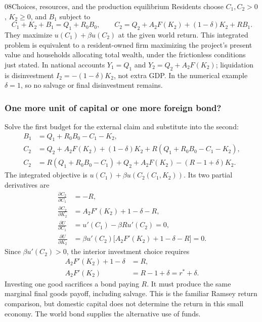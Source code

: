 \begin{modelsetup}[1]
\begin{modelcondition}{08}{Choices, resources, and the production equilibrium}
Residents choose $C_1,C_2>0$, $K_2\geq0$, and $B_1$ subject to
\[
 C_1+K_2+B_1=Q_1+R_0B_0,
 \qquad C_2=Q_2+A_2F(K_2)+(1-\delta)K_2+RB_1.
\]
They maximize $u(C_1)+\beta u(C_2)$ at the given world return. This integrated
problem is equivalent to a resident-owned firm maximizing the project's
present value and households allocating total wealth, under the frictionless
conditions just stated. In national accounts $Y_1=Q_1$ and
$Y_2=Q_2+A_2F(K_2)$; liquidation is disinvestment
$I_2=-(1-\delta)K_2$, not extra GDP. In the numerical example $\delta=1$,
so no salvage or final disinvestment remains.
\end{modelcondition}
\end{modelsetup}

\subsubsection{One more unit of capital or one more foreign bond?}

Solve the first budget for the external claim and substitute into the second:
\begin{align}
 B_1&=Q_1+R_0B_0-C_1-K_2,\\
 C_2&=Q_2+A_2F(K_2)+(1-\delta)K_2
       +R(Q_1+R_0B_0-C_1-K_2),\\
 C_2&=R(Q_1+R_0B_0-C_1)+Q_2+A_2F(K_2)
       -(R-1+\delta)K_2.\label{eq:open-joint-production}
\end{align}
The integrated objective is $u(C_1)+\beta u(C_2(C_1,K_2))$.
Its two partial derivatives are
\begin{align}
 \frac{\partial C_2}{\partial C_1}&=-R,\\
 \frac{\partial C_2}{\partial K_2}
 &=A_2F'(K_2)+1-\delta-R,\\
 \frac{\partial U}{\partial C_1}
 &=u'(C_1)-\beta R u'(C_2)=0,\\
 \frac{\partial U}{\partial K_2}
 &=\beta u'(C_2)\bigl[A_2F'(K_2)+1-\delta-R\bigr]=0.
\end{align}
Since $\beta u'(C_2)>0$, the interior investment choice requires
\begin{align}
 A_2F'(K_2)+1-\delta&=R,\\
 A_2F'(K_2)&=R-1+\delta=r^*+\delta.\label{eq:open-investment-foc}
\end{align}
Investing one good sacrifices a bond paying $R$. It must produce the same
marginal final goods payoff, including salvage. This is the familiar Ramsey
return comparison, but domestic capital does not determine the return in
this small economy. The world bond supplies the alternative use of funds.

